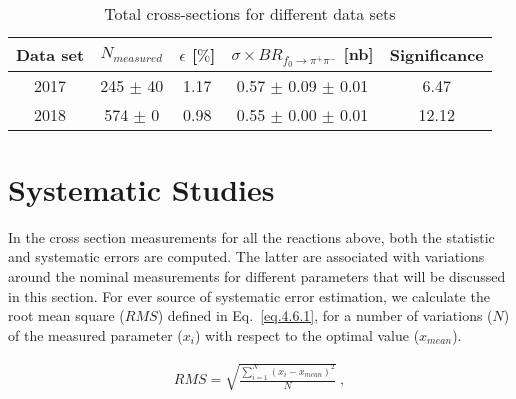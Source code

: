 \begin{table}[!htbp]
    \centering
    \caption{Total cross-sections for different data sets}
    \label{tab.4.5.4}
    \begin{tabular}{|c|c|c|c|c|}
        \hline
        Data set & $N_{measured}$ & $\epsilon$ [$\%$] & $\sigma \times BR_{f_{0}\rightarrow\pi^{+}\pi^{-}}$ [nb] & Significance\\
        \hline
        2017 & 245 $\pm$ 40 & 1.17 & 0.57 $\pm$ 0.09 $\pm$ 0.01 & 6.47 \\
        \hline
        2018 & 574 $\pm$ 0 & 0.98 & 0.55 $\pm$ 0.00 $\pm$ 0.01 & 12.12 \\
        \hline
    \end{tabular}
\end{table}

\section{Systematic Studies}
\label{p.4.6}

In the cross section measurements for all the reactions above, both the statistic and systematic errors are computed.
The latter are associated with variations around the nominal measurements for different parameters that will be discussed in this section. For ever source of systematic error estimation, we calculate the root mean square ($RMS$) defined in Eq.~\ref{eq.4.6.1}, for a number of variations ($N$) of the measured parameter ($x_i$) with respect to the optimal value ($x_{mean}$).

\begin{equation}
    \label{eq.4.6.1}
    \begin{aligned}
        RMS = \sqrt{\frac{\sum\limits_{i=1}^{N} (x_i-x_{mean})^2}{N}}~,
    \end{aligned}
\end{equation}

